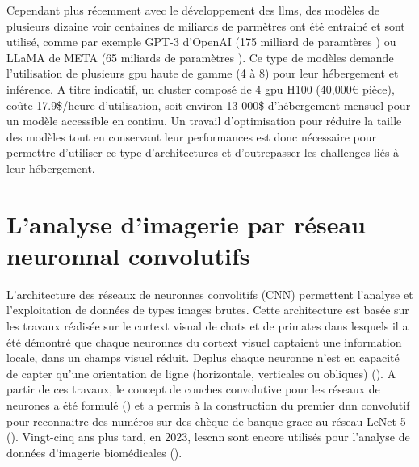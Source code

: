 Cependant plus récemment avec le développement des \gls{llms}, des modèles de plusieurs dizaine voir centaines de miliards de parmètres ont été entrainé et sont utilisé, comme par exemple GPT-3 d'OpenAI (175 milliard de paramtères \cite{brown_language_2020}) ou LLaMA de META (65 miliards de paramètres \cite{touvron_llama_2023}). Ce type de modèles demande l'utilisation de plusieurs \gls{gpu} haute de gamme (4 à 8) pour leur hébergement et inférence. A titre indicatif, un cluster composé de 4 \gls{gpu} H100 (40,000€ pièce), coûte 17.9\$/heure d'utilisation, soit environ 13 000\$ d'hébergement mensuel pour un modèle accessible en continu. Un travail d'optimisation pour réduire la taille des modèles tout en conservant leur performances est donc nécessaire pour permettre d'utiliser ce type d'architectures et d'outrepasser les challenges liés à leur hébergement.

\section{L'analyse d'imagerie par réseau neuronnal convolutifs}
L'architecture des réseaux de neuronnes convolitifs (CNN) permettent l'analyse et l'exploitation de données de types images brutes. Cette architecture est basée sur les travaux réalisée sur le cortext visual de chats et de primates dans lesquels il a été démontré que chaque neuronnes du cortext visuel captaient une information locale, dans un champs visuel réduit. Deplus chaque neuronne n'est en capacité de capter qu'une orientation de ligne (horizontale, verticales ou obliques) (\cite{hubel_receptive_1959, hubel_single_1959}). A partir de ces travaux, le concept de couches convolutive pour les réseaux de neurones a été formulé (\cite{fukushima_neocognitron_1980}) et a permis à la construction du premier \gls{dnn} convolutif pour reconnaitre des numéros sur des chèque de banque grace au réseau LeNet-5 (\cite{lecun_gradient-based_1998}). Vingt-cinq ans plus tard, en 2023, les\gls{cnn} sont encore utilisés pour l'analyse de données d'imagerie biomédicales (\cite{holscher_next-generation_2023, ker_automated_2019}).
 
